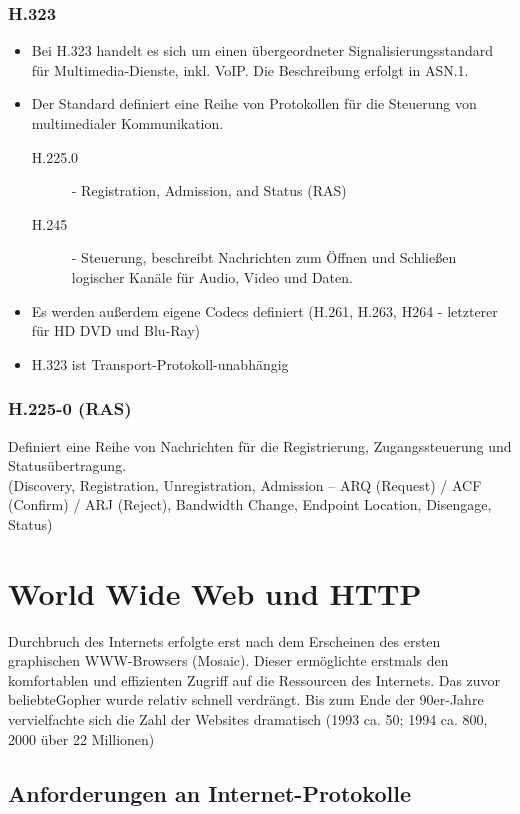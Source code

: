 \documentclass{article} %
\begin{document}
\subsubsection{H.323}	
	\begin{itemize}
	\item Bei H.323 handelt es sich um einen übergeordneter Signalisierungsstandard für Multimedia-Dienste, inkl. VoIP. Die Beschreibung erfolgt in ASN.1.
	\item Der Standard definiert eine Reihe von Protokollen für die Steuerung von multimedialer Kommunikation.
		\begin{description}
		\item[H.225.0] - Registration, Admission, and Status (RAS)
		\item[H.245] -  Steuerung, beschreibt Nachrichten zum Öffnen und Schließen logischer Kanäle für Audio, Video und Daten. 
		\end{description}
	\item Es werden außerdem eigene Codecs definiert (H.261, H.263, H264 - letzterer für HD DVD und Blu-Ray)
	\item H.323 ist Transport-Protokoll-unabhängig
	\end{itemize}
	
\subsubsection{H.225-0 (RAS)}
Definiert eine Reihe von Nachrichten für die Registrierung, Zugangssteuerung und Statusübertragung. \\
(Discovery, Registration, Unregistration, Admission – ARQ (Request) / ACF (Confirm) / ARJ (Reject), Bandwidth Change, Endpoint Location, Disengage, Status)



\section{World Wide Web und HTTP}
Durchbruch des Internets erfolgte erst nach dem Erscheinen des ersten graphischen WWW-Browsers (\glqq Mosaic\grqq).
Dieser ermöglichte erstmals den komfortablen und effizienten Zugriff auf die Ressourcen des Internets.
Das zuvor \glqq beliebte\grqq{\ }Gopher wurde relativ schnell verdrängt.
Bis zum Ende der 90er-Jahre vervielfachte sich die Zahl der Websites dramatisch (1993 ca. 50; 1994 ca. 800, 2000 über 22 Millionen)

\subsection{Anforderungen an Internet-Protokolle}
\end{document}
